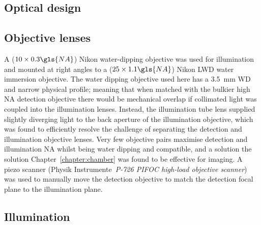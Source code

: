 \subsection{Optical design}

\subsection{Objective lenses}


A (\emph{\(10\times 0.3 \gls{NA}\)}) Nikon water-dipping objective was used for illumination and mounted at right angles to a (\emph{\(25\times1.1 \gls{NA}\)}) Nikon LWD water immersion objective.
The water dipping objective used here has a \SI{3.5}{\milli\meter} WD and narrow physical profile; meaning that when matched with the bulkier high NA detection objective
there would be mechanical overlap if collimated light was coupled into the illumination lenses.
Instead, the illumination tube lens supplied slightly diverging light to the back aperture of the illumination objective, which was found to efficiently resolve the challenge of separating the detection and illumination objective lenses.
Very few objective pairs maximise detection and illumination \gls{NA} whilst being water dipping and compatible, and a solution the solution Chapter~\ref{chapter:chamber} was found to be effective for imaging.
A piezo scanner (Physik Instrumente~\emph{P-726 PIFOC high-load objective scanner}) was used to manually move the detection objective to match the detection focal plane to the illumination plane.

\subsection{Illumination}

